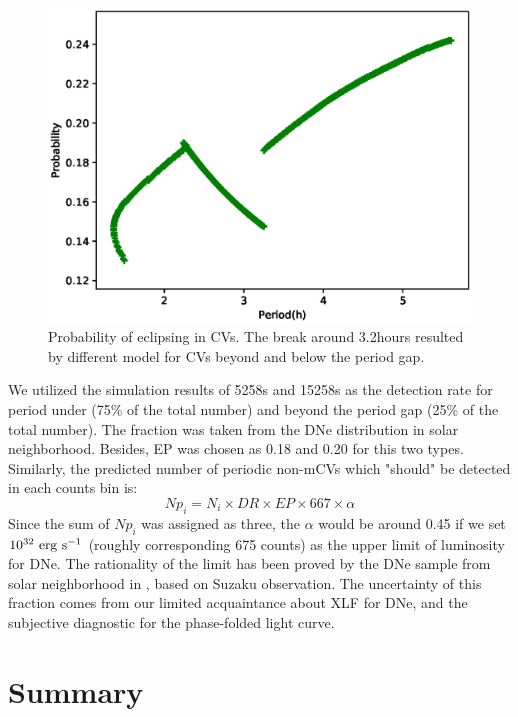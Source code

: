 \documentclass[fleqn,usenatbib]{mnras}
\begin{document}
\begin{figure}
\centering
\includegraphics[scale=0.55]{./figure/p_inCV.eps}
\caption{Probability of eclipsing in CVs. The break around 3.2hours resulted by different model for CVs beyond and below the period gap.\label{fig:simpCV}}
\end{figure}
We utilized the simulation results of 5258s and 15258s as the detection rate for period under (75\% of the total number) and beyond the period gap (25\% of the total number). The fraction was taken from the DNe distribution in solar neighborhood. Besides, EP was chosen as 0.18 and 0.20 for this two types.
Similarly, the predicted number of periodic non-mCVs which "should" be detected in each counts bin is:
\begin{equation}
Np_{i}=N_i\times DR \times EP \times 667 \times \alpha	
\end{equation}
Since the sum of $Np_{i}$ was assigned as three, the $\alpha$ would be around 0.45 if we set $\rm 10^{32}~erg~s^{-1}$ (roughly corresponding 675 counts) as the upper limit of luminosity for DNe. The rationality of the limit has been proved by the DNe sample from solar neighborhood in \citep{2016ApJ...818..136X}, based on Suzaku observation. The uncertainty of this fraction comes from our limited acquaintance about XLF for DNe, and the subjective diagnostic for the phase-folded light curve. 


\section{Summary}\label{sec:summary}
\end{document}
